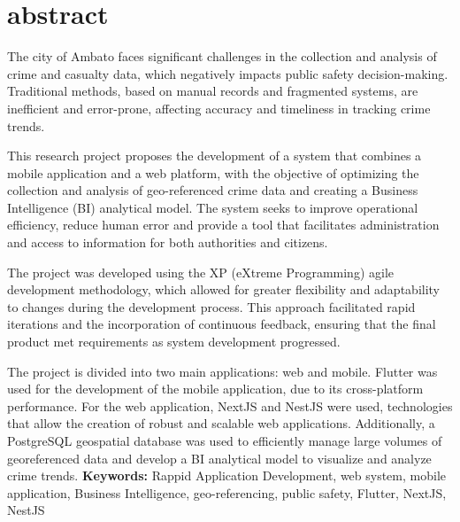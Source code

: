 \newpage
\chapter*{abstract}
The city of Ambato faces significant challenges in the collection and analysis of crime and casualty data,
which negatively impacts public safety decision-making. Traditional methods, based on manual records and
fragmented systems, are inefficient and error-prone, affecting accuracy and timeliness in tracking crime trends.
\bigbreak

This research project proposes the development of a system that combines a mobile application and a web platform,
with the objective of optimizing the collection and analysis of geo-referenced crime data and creating a Business
Intelligence (BI) analytical model. The system seeks to improve operational efficiency, reduce human error and provide
a tool that facilitates administration and access to information for both authorities and citizens.
\bigbreak

The project was developed using the XP (eXtreme Programming) agile development methodology, which allowed for greater flexibility
and adaptability to changes during the development process. This approach facilitated rapid iterations and the incorporation
of continuous feedback, ensuring that the final product met requirements as system development progressed.
\bigbreak

The project is divided into two main applications: web and mobile. Flutter was used for the development of the mobile
application, due to its cross-platform performance. For the web application, NextJS and NestJS were used, technologies
that allow the creation of robust and scalable web applications. Additionally, a PostgreSQL geospatial database was
used to efficiently manage large volumes of georeferenced data and develop a BI analytical model to visualize and
analyze crime trends.
\vfill
\textbf{Keywords:} Rappid Application Development, web system, mobile application, Business Intelligence,
geo-referencing, public safety, Flutter, NextJS, NestJS
